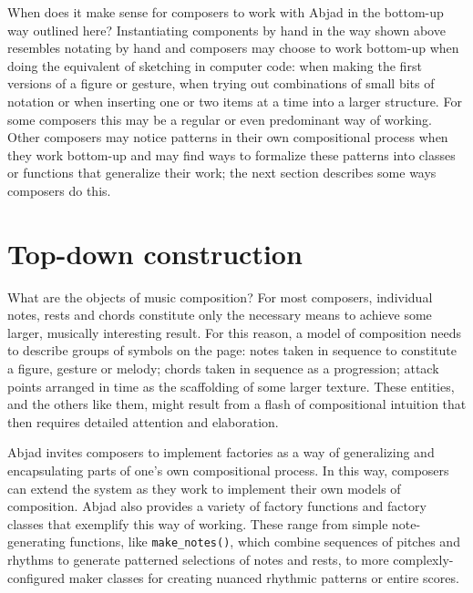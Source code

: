\documentclass{article}
\begin{document}
\noindent When does it make sense for composers to work with Abjad in the
bottom-up way outlined here? Instantiating components by hand in the way shown
above resembles notating by hand and composers may choose to work bottom-up
when doing the equivalent of sketching in computer code: when making the first
versions of a figure or gesture, when trying out combinations of small bits of
notation or when inserting one or two items at a time into a larger structure.
For some composers this may be a regular or even predominant way of working.
Other composers may notice patterns in their own compositional process when
they work bottom-up and may find ways to formalize these patterns into classes
or functions that generalize their work; the next section describes some ways
composers do this.


\section{Top-down construction} \label{sec:top-down}

What are the objects of music composition? For most composers, individual
notes, rests and chords constitute  only the necessary means to achieve some
larger, musically interesting result. For this reason, a model of composition
needs to describe groups of symbols on the page: notes taken in sequence to
constitute a figure, gesture or melody; chords taken in sequence as a
progression; attack points arranged in time as the scaffolding of some larger
texture. These entities, and the others like them, might result from a flash of
compositional intuition that then requires detailed attention and elaboration.

Abjad invites composers to implement factories as a way of generalizing and
encapsulating parts of one's own compositional process. In this way, composers
can extend the system as they work to implement their own models of
composition. Abjad also provides a variety of factory functions and factory
classes that exemplify this way of working. These range from simple
note-generating functions, like \texttt{make\_notes()}, which combine sequences
of pitches and rhythms to generate patterned selections of notes and rests, to
more complexly-configured maker classes for creating nuanced rhythmic patterns
or entire scores.
\end{document}
